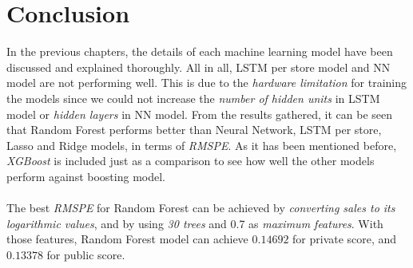 \chapter{Conclusion}
In the previous chapters, the details of each machine learning model have been discussed and explained thoroughly. All in all, LSTM per store model and NN model are not performing well. This is due to the \textit{hardware limitation} for training the models since we could not increase the \textit{number of hidden units} in LSTM model or \textit{hidden layers} in NN model. From the results gathered, it can be seen that Random Forest performs better than Neural Network, LSTM per store, Lasso and Ridge models, in terms of \textit{RMSPE}. As it has been mentioned before, \textit{XGBoost} is included just as a comparison to see how well the other models perform against boosting model. \\ \\
The best \textit{RMSPE} for Random Forest can be achieved by \textit{converting sales to its logarithmic values}, and by using \textit{30 trees} and 0.7 as \textit{maximum features}. With those features, Random Forest model can achieve $0.14692$ for private score, and $0.13378$ for public score.  
